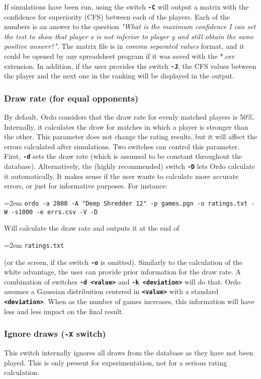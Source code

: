 \documentclass[12pt]{article}
\newcommand{\swtch} [1] {\texttt{\textbf{#1}}}
\newcommand{\cmdln}[1]{
	\par
	\begingroup
		\leftskip=2em
		\addtolength{\rightskip}{0em}
		\noindent \small{\texttt{#1}}
		\par
	\endgroup
}
\begin{document}
If simulations have been run, using the switch \swtch{-C} will output a matrix with the confidence for superiority (CFS) between each of the players.
Each of the numbers is an answer to the question \textit{"What is the maximum confidence I can set the test to show that player x is not inferior to player y and still obtain the same positive answer?"}.
The matrix file is in \textit{comma separated values} format, and it could be opened by any spreadsheet program if it was saved with the *.csv extension.
In addition, if the user provides the switch \swtch{-J}, the CFS values between the player and the next one in the ranking will be displayed in the output.

\subsubsection*{Draw rate (for equal opponents)}
By default, Ordo considers that the draw rate for evenly matched players is 50\%.
Internally, it calculates the draw for matches in which a player is stronger than the other.
This parameter does not change the rating results, but it will affect the errors calculated after simulations.
Two switches can control this parameter. 
First, \swtch{-d} sets the draw rate (which is assumed to be constant throughout the database). 
Alternatively, the (highly recommended) switch \swtch{-D} lets Ordo calculate it automatically. 
It makes sense if the user wants to calculate more accurate errors, or just for informative purposes.
For instance:

\cmdln{ordo -a 2800 -A "Deep Shredder 12" -p games.pgn -o ratings.txt -W -s1000 -e errs.csv -V -D}

Will calculate the draw rate and outputs it at the end of \cmdln{ratings.txt} (or the screen, if the switch \swtch{-o} is omitted). 
Similarly to the calculation of the white advantage, the user can provide prior information for the draw rate.
A combination of switches \swtch{-d <value>} and \swtch{-k <deviation>} will do that.
Ordo assumes a Gaussian distribution centered in \swtch{<value>} with a standard \swtch{<deviation>}.
When as the number of games increases, this information will have less and less impact on the final result.

\subsubsection*{Ignore draws (\swtch{-X} switch)}

This switch internally ignores all draws from the database as they have not been played.
This is only present for experimentation, not for a serious rating calculation.
\end{document}
